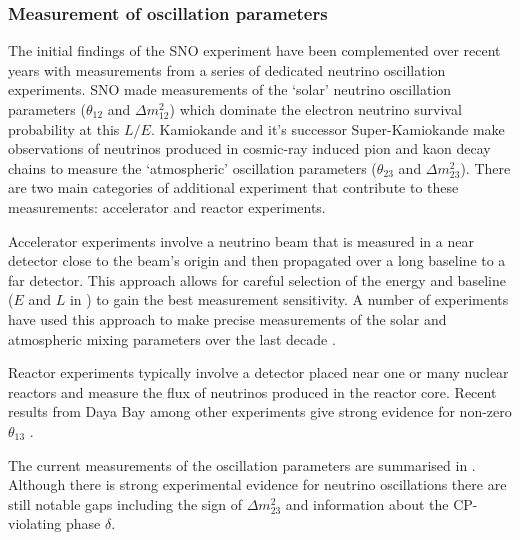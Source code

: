 \subsubsection{Measurement of oscillation parameters}
\label{section:particle-physics:neutrino-oscilltions:parameters}

The initial findings of the SNO experiment have been complemented over recent years with measurements from a series of dedicated neutrino oscillation experiments. SNO made measurements of the `solar' neutrino oscillation parameters ($\theta_{12}$ and $\Delta m_{12}^{2}$) which dominate the electron neutrino survival probability at this $L/E$. Kamiokande \cite{PhysRevLett.81.2016} and it's successor Super-Kamiokande \cite{PhysRevD.71.112005} make observations of neutrinos produced in cosmic-ray induced pion and kaon decay chains to measure the `atmospheric' oscillation parameters ($\theta_{23}$ and $\Delta m_{23}^{2}$). There are two main categories of additional experiment that contribute to these measurements: accelerator and reactor experiments.

Accelerator experiments involve a neutrino beam that is measured in a near detector close to the beam's origin and then propagated over a long baseline to a far detector. This approach allows for careful selection of the energy and baseline ($E$ and $L$ in ) to gain the best measurement sensitivity. A number of experiments have used this approach to make precise measurements of the solar and atmospheric mixing parameters over the last decade \cite{PhysRevD.74.072003} \cite{PhysRevLett.101.131802} \cite{PhysRevLett.107.041801}.

 Reactor experiments typically involve a detector placed near one or many nuclear reactors and measure the flux of neutrinos produced in the reactor core. Recent results from Daya Bay among other experiments give strong evidence for non-zero $\theta_{13}$ \cite{PhysRevLett.108.171803} \cite{PhysRevLett.108.131801} \cite{PhysRevLett.108.191802}. 

The current measurements of the oscillation parameters are summarised in . Although there is strong experimental evidence for neutrino oscillations there are still notable gaps including the sign of $\Delta m^{2}_{23}$ and information about the CP-violating phase $\delta$.


